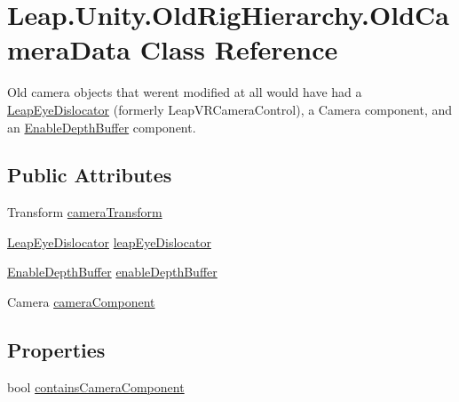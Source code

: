 \hypertarget{class_leap_1_1_unity_1_1_old_rig_hierarchy_1_1_old_camera_data}{}\section{Leap.\+Unity.\+Old\+Rig\+Hierarchy.\+Old\+Camera\+Data Class Reference}
\label{class_leap_1_1_unity_1_1_old_rig_hierarchy_1_1_old_camera_data}


Old camera objects that weren\textquotesingle{}t modified at all would have had a \mbox{\hyperlink{class_leap_1_1_unity_1_1_leap_eye_dislocator}{Leap\+Eye\+Dislocator}} (formerly Leap\+V\+R\+Camera\+Control), a Camera component, and an \mbox{\hyperlink{class_leap_1_1_unity_1_1_enable_depth_buffer}{Enable\+Depth\+Buffer}} component.  


\subsection*{Public Attributes}
\begin{DoxyCompactItemize}
\item 
Transform \mbox{\hyperlink{class_leap_1_1_unity_1_1_old_rig_hierarchy_1_1_old_camera_data_a14376c67e293af5af3bb537ead0db3c4}{camera\+Transform}}
\item 
\mbox{\hyperlink{class_leap_1_1_unity_1_1_leap_eye_dislocator}{Leap\+Eye\+Dislocator}} \mbox{\hyperlink{class_leap_1_1_unity_1_1_old_rig_hierarchy_1_1_old_camera_data_a4bb67ab7dfcc19a17639076bd8898612}{leap\+Eye\+Dislocator}}
\item 
\mbox{\hyperlink{class_leap_1_1_unity_1_1_enable_depth_buffer}{Enable\+Depth\+Buffer}} \mbox{\hyperlink{class_leap_1_1_unity_1_1_old_rig_hierarchy_1_1_old_camera_data_a01e96989d95f3fe13b5e2251676abd08}{enable\+Depth\+Buffer}}
\item 
Camera \mbox{\hyperlink{class_leap_1_1_unity_1_1_old_rig_hierarchy_1_1_old_camera_data_a064374ed9ef4561816be21780153877f}{camera\+Component}}
\end{DoxyCompactItemize}
\subsection*{Properties}
\begin{DoxyCompactItemize}
\item 
bool \mbox{\hyperlink{class_leap_1_1_unity_1_1_old_rig_hierarchy_1_1_old_camera_data_a0a3d7df4087ea5635ff1d0749d7be4ad}{contains\+Camera\+Component}}
\end{DoxyCompactItemize}


